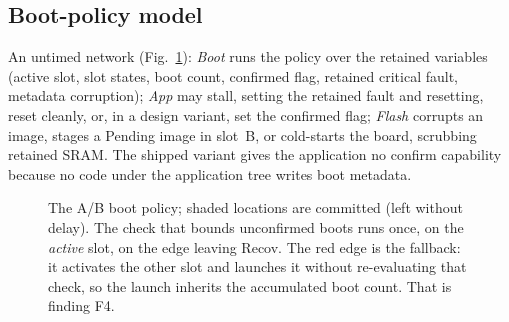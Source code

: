 \documentclass[conference,a4paper]{IEEEtran}
\begin{document}
\subsection{Boot-policy model}
An untimed network (Fig.~\ref{fig:boot}): \emph{Boot} runs the policy over the retained variables (active slot, slot states, boot count, confirmed flag, retained critical fault, metadata corruption); \emph{App} may stall, setting the retained fault and resetting, reset cleanly, or, in a design variant, set the confirmed flag; \emph{Flash} corrupts an image, stages a Pending image in slot~B, or cold-starts the board, scrubbing retained SRAM. The shipped variant gives the application no confirm capability because no code under the application tree writes boot metadata.



\begin{figure}[t]
\centering
{}
\caption{The A/B boot policy; shaded locations are committed (left without delay). The check that bounds unconfirmed boots runs once, on the \emph{active} slot, on the edge leaving Recov. The red edge is the fallback: it activates the other slot and launches it without re-evaluating that check, so the launch inherits the accumulated boot count. That is finding F4.}
\label{fig:boot}
\end{figure}
\end{document}
